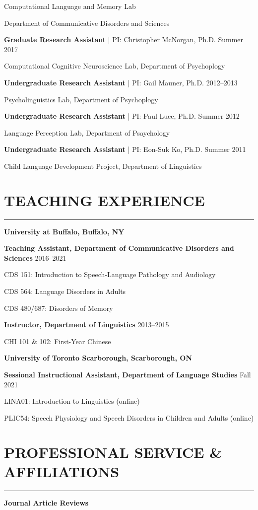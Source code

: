 \documentclass[11pt]{article}
\newcommand{\cvsection}[1]{\vspace{-0.2cm}\section*{\Large #1}\vspace{-0.2cm}\hrule\vspace{0.2cm}}
\newcommand{\h}[1]{\hspace{15pt} #1}
\begin{document}
\h{Computational Language and Memory Lab}

\h{Department of Communicative Disorders and Sciences}

\textbf{Graduate Research Assistant} | PI: Christopher McNorgan, Ph.D. \hfill Summer 2017

\h{Computational Cognitive Neuroscience Lab, Department of Psychoplogy}

\textbf{Undergraduate Research Assistant} | PI: Gail Mauner, Ph.D. \hfill 2012--2013

\h{Psycholinguistics Lab, Department of Psychoplogy}

\textbf{Undergraduate Research Assistant} | PI: Paul Luce, Ph.D. \hfill Summer 2012

\h{Language Perception Lab, Department of Psaychology}

\textbf{Undergraduate Research Assistant} | PI: Eon-Suk Ko, Ph.D. \hfill Summer 2011

\h{Child Language Development Project, Department of Linguistics}



\cvsection{TEACHING EXPERIENCE}

\textbf{\large University at Buffalo, Buffalo, NY}

\textbf{Teaching Assistant, Department of Communicative Disorders and Sciences} \hfill 2016--2021

\h{CDS 151: Introduction to Speech-Language Pathology and Audiology}

\h{CDS 564: Language Disorders in Adults}

\h{CDS 480/687: Disorders of Memory}

\textbf{Instructor, Department of Linguistics} \hfill 2013--2015

\h{CHI 101 \& 102: First-Year Chinese}

\pagebreak

\textbf{\large University of Toronto Scarborough, Scarborough, ON}

\textbf{Sessional Instructional Assistant, Department of Language Studies} \hfill Fall 2021

\h{LINA01: Introduction to Linguistics (online)}

\h{PLIC54: Speech Physiology and Speech Disorders in Children and Adults (online)}

\cvsection{PROFESSIONAL SERVICE \& AFFILIATIONS}

\textbf{Journal Article Reviews}
\end{document}
